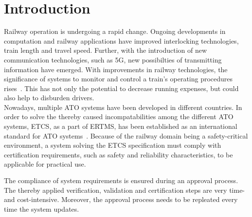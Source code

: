 \chapter{Introduction}
	
Railway operation is undergoing a rapid change.
Ongoing developments in computation and railway applications have improved interlocking technologies, train length and travel speed.
Further, with the introduction of new communication technologies, such as 5G, new possibilties of transmitting information have emerged.
With improvements in railway technologies, the significance of  systems to monitor and control a train's operating procedures rises~\cite{YIN2017RNDofATO}.
This has not only the potential to decrease running expenses, but could also help to disburden drivers.
\\

Nowadays, multiple \gls*{ATO} systems have been developed in different countries.
In order to solve the thereby caused incompatabilities among the different \gls*{ATO} systems, \gls*{ETCS}, as a part of \gls*{ERTMS}, has been established as an international standard for \gls*{ATO} systems~\cite{ETCS26}.
Because of the railway domain being a safety-critical environment, a system solving the \gls*{ETCS} specification must comply with certification requirements, such as safety and reliability characteristics, to be applicable for practical use.

The compliance of system requirements is ensured during an approval process.
The thereby applied verification, validation and certification steps are very time- and cost-intensive.
Moreover, the approval process needs to be repleated every time the system updates.
\\

